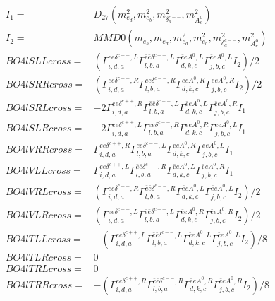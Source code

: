 \documentclass[A4,landscape]{article}
\begin{document}
\begin{align} 
I_1 = & D_{27}(m^2_{e_{{d}}}, m^2_{e_{{b}}}, m^2_{\delta^{c--}_{{a}}}, m^2_{A^0_{{c}}}) \\ 
I_2 = & MMD0(m_{e_{{b}}}, m_{e_{{d}}}, m^2_{e_{{d}}}, m^2_{e_{{b}}}, m^2_{\delta^{c--}_{{a}}}, m^2_{A^0_{{c}}}) \\ 
  BO4lSLLcross= & ( \Gamma^{e e \delta^{c++},L}_{i, d, a} \Gamma^{\bar{e}\bar{e}\delta^{c--} ,L}_{l, b, a} \Gamma^{\bar{e}e A^0 ,L}_{d, k, c} \Gamma^{\bar{e}e A^0 ,L}_{j, b, c} I_2)/2 \\ 
  BO4lSRRcross= & ( \Gamma^{e e \delta^{c++},R}_{i, d, a} \Gamma^{\bar{e}\bar{e}\delta^{c--} ,R}_{l, b, a} \Gamma^{\bar{e}e A^0 ,R}_{d, k, c} \Gamma^{\bar{e}e A^0 ,R}_{j, b, c} I_2)/2 \\ 
  BO4lSRLcross= & -2  \Gamma^{e e \delta^{c++},R}_{i, d, a} \Gamma^{\bar{e}\bar{e}\delta^{c--} ,L}_{l, b, a} \Gamma^{\bar{e}e A^0 ,L}_{d, k, c} \Gamma^{\bar{e}e A^0 ,R}_{j, b, c} I_1 \\ 
  BO4lSLRcross= & -2  \Gamma^{e e \delta^{c++},L}_{i, d, a} \Gamma^{\bar{e}\bar{e}\delta^{c--} ,R}_{l, b, a} \Gamma^{\bar{e}e A^0 ,R}_{d, k, c} \Gamma^{\bar{e}e A^0 ,L}_{j, b, c} I_1 \\ 
  BO4lVRRcross= &  \Gamma^{e e \delta^{c++},R}_{i, d, a} \Gamma^{\bar{e}\bar{e}\delta^{c--} ,L}_{l, b, a} \Gamma^{\bar{e}e A^0 ,R}_{d, k, c} \Gamma^{\bar{e}e A^0 ,L}_{j, b, c} I_1 \\ 
  BO4lVLLcross= &  \Gamma^{e e \delta^{c++},L}_{i, d, a} \Gamma^{\bar{e}\bar{e}\delta^{c--} ,R}_{l, b, a} \Gamma^{\bar{e}e A^0 ,L}_{d, k, c} \Gamma^{\bar{e}e A^0 ,R}_{j, b, c} I_1 \\ 
  BO4lVRLcross= & ( \Gamma^{e e \delta^{c++},R}_{i, d, a} \Gamma^{\bar{e}\bar{e}\delta^{c--} ,R}_{l, b, a} \Gamma^{\bar{e}e A^0 ,L}_{d, k, c} \Gamma^{\bar{e}e A^0 ,L}_{j, b, c} I_2)/2 \\ 
  BO4lVLRcross= & ( \Gamma^{e e \delta^{c++},L}_{i, d, a} \Gamma^{\bar{e}\bar{e}\delta^{c--} ,L}_{l, b, a} \Gamma^{\bar{e}e A^0 ,R}_{d, k, c} \Gamma^{\bar{e}e A^0 ,R}_{j, b, c} I_2)/2 \\ 
  BO4lTLLcross= & -( \Gamma^{e e \delta^{c++},L}_{i, d, a} \Gamma^{\bar{e}\bar{e}\delta^{c--} ,L}_{l, b, a} \Gamma^{\bar{e}e A^0 ,L}_{d, k, c} \Gamma^{\bar{e}e A^0 ,L}_{j, b, c} I_2)/8 \\ 
  BO4lTLRcross= & 0 \\ 
  BO4lTRLcross= & 0 \\ 
  BO4lTRRcross= & -( \Gamma^{e e \delta^{c++},R}_{i, d, a} \Gamma^{\bar{e}\bar{e}\delta^{c--} ,R}_{l, b, a} \Gamma^{\bar{e}e A^0 ,R}_{d, k, c} \Gamma^{\bar{e}e A^0 ,R}_{j, b, c} I_2)/8 \\ 
\end{align} 
\end{document}
